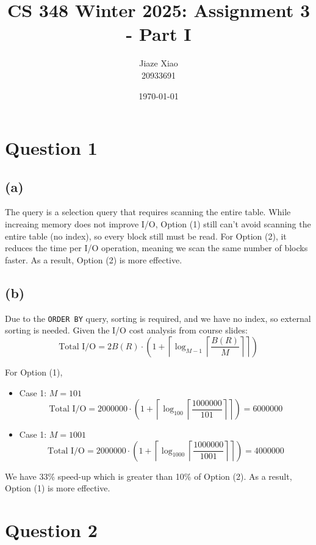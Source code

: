 \documentclass{article}
\title{\textbf{CS 348 Winter 2025: Assignment 3 - Part I}}
\author{Jiaze Xiao \\ 20933691}
\date{\today}
\begin{document}
\maketitle

\section*{Question 1}
\subsection*{(a)}
The query is a selection query that requires scanning the entire table. While increaing memory does not improve I/O, Option (1) still can't avoid scanning the entire table (no index), so every block still must be read. For Option (2), it reduces the time per I/O operation, meaning we scan the same number of blocks faster. As a result, Option (2) is more effective.
\subsection*{(b)}
Due to the \texttt{ORDER BY} query, sorting is required, and we have no index, so external sorting is needed. Given the I/O cost analysis from course slides:
$$
  \text{Total I/O} = 2B(R)\cdot\left(1+\left\lceil\log_{M-1}\left\lceil\dfrac{B(R)}{M}\right\rceil\right\rceil\right)
$$

For Option (1),
\begin{itemize}
  \item Case 1: $M=101$
        $$\text{Total I/O} = 2000000\cdot\left(1+\left\lceil\log_{100}\left\lceil\dfrac{1000000}{101}\right\rceil\right\rceil\right)=6000000$$
  \item Case 1: $M=1001$
        $$\text{Total I/O} = 2000000\cdot\left(1+\left\lceil\log_{1000}\left\lceil\dfrac{1000000}{1001}\right\rceil\right\rceil\right)=4000000$$
\end{itemize}
We have 33\% speed-up which is greater than 10\% of Option (2). As a result, Option (1) is more effective.

\newpage
\section*{Question 2}
\end{document}
